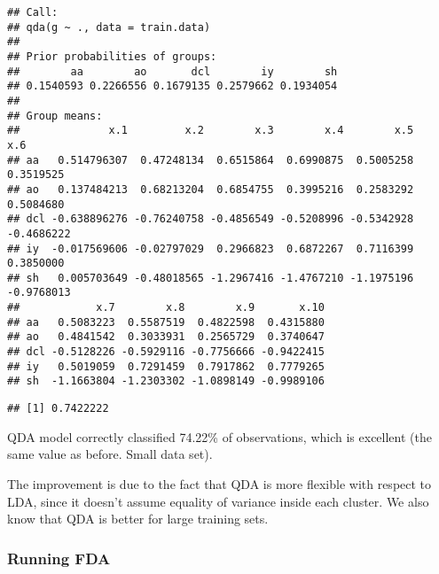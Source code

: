 \documentclass[
]{article}
\newenvironment{Shaded}{\begin{snugshade}}{\end{snugshade}}
\newcommand{\CommentTok}[1]{\textcolor[rgb]{0.56,0.35,0.01}{\textit{#1}}}
\newcommand{\FunctionTok}[1]{\textcolor[rgb]{0.00,0.00,0.00}{#1}}
\newcommand{\NormalTok}[1]{#1}
\newcommand{\OtherTok}[1]{\textcolor[rgb]{0.56,0.35,0.01}{#1}}
\newcommand{\SpecialCharTok}[1]{\textcolor[rgb]{0.00,0.00,0.00}{#1}}
\begin{document}
\begin{verbatim}
## Call:
## qda(g ~ ., data = train.data)
## 
## Prior probabilities of groups:
##        aa        ao       dcl        iy        sh 
## 0.1540593 0.2266556 0.1679135 0.2579662 0.1934054 
## 
## Group means:
##              x.1         x.2        x.3        x.4        x.5        x.6
## aa   0.514796307  0.47248134  0.6515864  0.6990875  0.5005258  0.3519525
## ao   0.137484213  0.68213204  0.6854755  0.3995216  0.2583292  0.5084680
## dcl -0.638896276 -0.76240758 -0.4856549 -0.5208996 -0.5342928 -0.4686222
## iy  -0.017569606 -0.02797029  0.2966823  0.6872267  0.7116399  0.3850000
## sh   0.005703649 -0.48018565 -1.2967416 -1.4767210 -1.1975196 -0.9768013
##            x.7        x.8        x.9       x.10
## aa   0.5083223  0.5587519  0.4822598  0.4315880
## ao   0.4841542  0.3033931  0.2565729  0.3740647
## dcl -0.5128226 -0.5929116 -0.7756666 -0.9422415
## iy   0.5019059  0.7291459  0.7917862  0.7779265
## sh  -1.1663804 -1.2303302 -1.0898149 -0.9989106
\end{verbatim}

\begin{Shaded}
\end{Shaded}

\begin{verbatim}
## [1] 0.7422222
\end{verbatim}

QDA model correctly classified 74.22\% of observations, which is
excellent (the same value as before. Small data set).

The improvement is due to the fact that QDA is more flexible with
respect to LDA, since it doesn't assume equality of variance inside each
cluster. We also know that QDA is better for large training sets.

\hypertarget{running-fda}{%
\subsubsection{Running FDA}\label{running-fda}}
\end{document}
